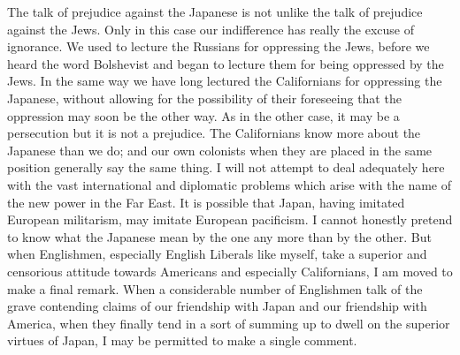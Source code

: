 \documentclass{book}
\begin{document}
The talk of prejudice against the Japanese is not unlike the talk of prejudice against the Jews. Only in this case our indifference has really the excuse of ignorance. We used to lecture the Russians for oppressing the Jews, before we heard the word Bolshevist and began to lecture them for being oppressed by the Jews. In the same way we have long lectured the Californians for oppressing the Japanese, without allowing for the possibility of their foreseeing that the oppression may soon be the other way. As in the other case, it may be a persecution but it is not a prejudice. The Californians know more about the Japanese than we do; and our own colonists when they are placed in the same position generally say the same thing. I will not attempt to deal adequately here with the vast international and diplomatic problems which arise with the name of the new power in the Far East. It is possible that Japan, having imitated European militarism, may imitate European pacificism. I cannot honestly pretend to know what the Japanese mean by the one any more than by the other. But when Englishmen, especially English Liberals like myself, take a superior and censorious attitude towards Americans and especially Californians, I am moved to make a final remark. When a considerable number of Englishmen talk of the grave contending claims of our friendship with Japan and our friendship with America, when they finally tend in a sort of summing up to dwell on the superior virtues of Japan, I may be permitted to make a single comment.
\end{document}

